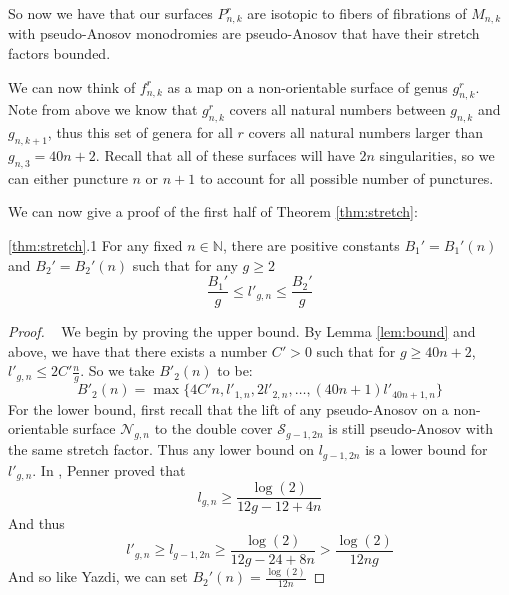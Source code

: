 So now we have that our surfaces $P^r_{n,k}$ are isotopic to fibers of fibrations of $M_{n,k}$ with pseudo-Anosov monodromies are pseudo-Anosov that have their stretch factors bounded.

We can now think of $f^r_{n,k}$ as a map on a non-orientable surface of genus $g^r_{n,k}$. Note from above we know that $g^r_{n,k}$ covers all natural numbers between $g_{n,k}$ and $g_{n,k+1}$, thus this set of genera for all $r$ covers all natural numbers larger than $g_{n,3} = 40n + 2$. Recall that all of these surfaces will have $2n$ singularities, so we can either puncture $n$ or $n + 1$ to account for all possible number of punctures.

We can now give a proof of the first half of Theorem \ref{thm:stretch}:

\begin{manualtheorem}{\ref{thm:stretch}.1}
For any fixed $n \in \mathbb{N}$, there are positive constants $B_1' = B_1'(n)$ and $B_2' = B_2'(n)$ such that for any $g \geq 2$
$$\frac{B_1'}{g} \leq l'_{g,n} \leq \frac{B_2'}{g}$$
\end{manualtheorem}
\begin{proof}
    ~
    We begin by proving the upper bound. By Lemma \ref{lem:bound} and above, we have that there exists a number $C' > 0$ such that for $g \geq 40n + 2$, $l'_{g,n} \leq 2C'\frac{n}{g}$. So we take $B'_2(n)$ to be:
    $$B'_2(n) = \max\{4C'n, l'_{1,n}, 2l'_{2,n}, \dots, (40n + 1)l'_{40n+1,n}\}$$
    For the lower bound, first recall that the lift of any pseudo-Anosov on a non-orientable surface $\mathcal{N}_{g,n}$ to the double cover $\mathcal{S}_{g-1,2n}$ is still pseudo-Anosov with the same stretch factor. Thus any lower bound on $l_{g-1,2n}$ is a lower bound for $l'_{g,n}$. In \cite{penner1991bounds}, Penner proved that
    $$l_{g,n} \geq \frac{\log(2)}{12g - 12 + 4n}$$
    And thus $$l'_{g,n} \geq l_{g-1,2n} \geq \frac{\log(2)}{12g - 24 + 8n} > \frac{\log(2)}{12ng}$$
    And so like Yazdi, we can set $B_2'(n) = \frac{\log(2)}{12n}$
\end{proof}
